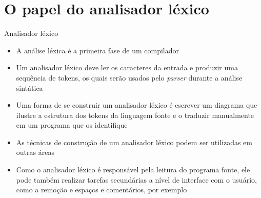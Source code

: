 \section{O papel do analisador léxico}

\begin{frame}[fragile]{Analisador léxico}

    \begin{itemize}
        \item A análise léxica é a primeira fase de um compilador
        \pause

        \item Um analisador léxico deve ler os caracteres da entrada e produzir uma sequência de tokens, os quais serão usados pelo \textit{parser} durante a
            análise sintática
        \pause

        \item Uma forma de se construir um analisador léxico é escrever um diagrama que ilustre a estrutura dos tokens da linguagem fonte e o traduzir manualmente
            em um programa que os identifique
        \pause

        \item As técnicas de construção de um analisador léxico podem ser utilizadas em outras áreas
        \pause

        \item Como o analisador léxico é responsável pela leitura do programa fonte, ele pode também realizar tarefas secundárias a nível de interface com
            o usuário, como a remoção e espaços e comentários, por exemplo
    \end{itemize}

\end{frame}

